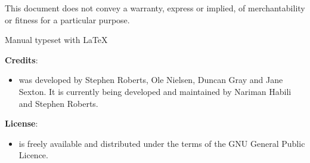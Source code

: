 This document does not convey a warranty, express or implied,
of merchantability or fitness for a particular purpose.

\begin{center}
   \anuga

   Manual typeset with \LaTeX
\end{center}

\vspace{0.5in}

\textbf{Credits}:
\begin{itemize}
\item \anuga was developed by Stephen Roberts, Ole Nielsen, Duncan Gray and Jane Sexton. It is currently being developed and
 maintained by Nariman Habili and Stephen Roberts.
\end{itemize}

\textbf{License}:
\begin{itemize}
\item \anuga is freely available and distributed under the terms of the GNU General Public Licence.
\end{itemize}

